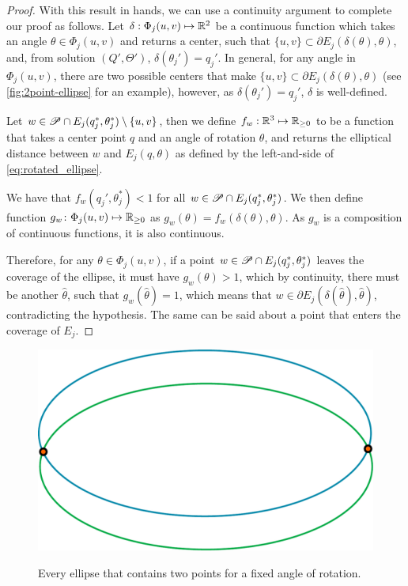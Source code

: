 \begin{proof}
	With this result in hands, we can use a continuity argument to complete our proof as follows.
	Let $\delta : \Phi_j(u,v) \mapsto \mathbb{R}^2$ be a continuous function which takes an angle $\theta\in\Phi_j(u,v)$ and returns a center, such that $\{u,v\} \subset \partial E_j(\delta(\theta), \theta)$, and, from solution $(Q', \Theta')$, $\delta(\theta_j') = q_j'$.
	In general, for any angle in $\Phi_j(u,v)$, there are two possible centers that make $\{u,v\} \subset \partial E_j(\delta(\theta), \theta)$ (see \autoref{fig:2point-ellipse} for an example), however, as $\delta(\theta_j') = q_j'$, $\delta$ is well-defined.
	
	Let $w\in \mathscr{P} \cap E_j(q_j^*, \theta_j^*) \setminus \{u,v\}$, then we define $f_w  : \mathbb{R}^3 \mapsto \mathbb{R}_{\ge0}$ to be a function that takes a center point $q$ and an angle of rotation $\theta$, and returns the elliptical distance between $w$ and $E_j(q, \theta)$ as defined by the left-and-side of \autoref{eq:rotated_ellipse}.
	
	We have that $f_w(q_j', \theta_j^*) < 1$ for all $w\in \mathscr{P} \cap E_j(q_j^*, \theta_j^*)$. We then define function $g_w\colon \Phi_j(u,v) \mapsto \mathbb{R}_{\ge0}$ as $g_w(\theta) = f_w(\delta(\theta), \theta)$. As $g_w$ is a composition of continuous functions, it is also continuous.
	
	Therefore, for any $\theta\in\Phi_j(u,v)$, if a point $w \in \mathscr{P} \cap E_j(q_j^*, \theta_j^*)$ leaves the coverage of the ellipse, it must have $g_w(\theta)>1$, which by continuity, there must be another $\hat{\theta}$, such that $g_w(\hat{\theta})=1$, which means that $w\in \partial E_j(\delta(\hat{\theta}), \hat{\theta})$, contradicting the hypothesis. The same can be said about a point that enters the coverage of $E_j$.
\end{proof}

\begin{figure}[H]
	\centering
	\caption{Every ellipse that contains two points for a fixed angle of rotation.}
	\includegraphics[scale=.36]{tex/figures/2point-ellipse}
	\fautor
	\label{fig:2point-ellipse}
\end{figure}


